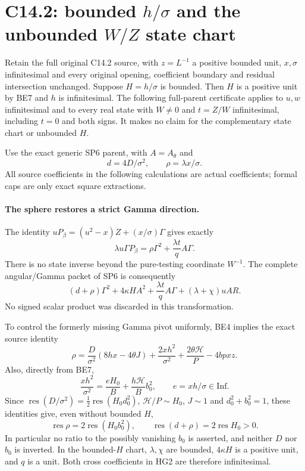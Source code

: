 \section{C14.2: bounded $h/\sigma$ and the unbounded $W/Z$ state chart}
\label{sec:r19-c142-bounded-H}

Retain the full original C14.2 source, with $z=L^{-1}$ a positive
bounded unit, $x,\sigma$ infinitesimal and every original opening,
coefficient boundary and residual intersection unchanged.  Suppose
$H=h/\sigma$ is bounded.  Then $H$ is a positive unit by BE7 and
$h$ is infinitesimal.  The following full-parent certificate applies
to $u,w$ infinitesimal and to every real state with $W\ne0$ and
$t=Z/W$ infinitesimal, including $t=0$ and both signs.  It makes
no claim for the complementary state chart or unbounded $H$.

Use the exact generic SP6 parent, with $A=A_\theta$ and
\[
 d=4D/\sigma^2,\qquad \rho=\lambda x/\sigma.
\]
All source coefficients in the following calculations are actual
coefficients; formal caps are only exact square extractions.

\paragraph{The sphere restores a strict Gamma direction.}
The identity $uP_\beta=(u^2-x)Z+(x/\sigma)\Gamma$ gives exactly
\[
 \lambda u\Gamma P_\beta
       =\rho\Gamma^2+\frac{\lambda t}{q}A\Gamma.
 \tag{HG1}
\]
There is no state inverse beyond the pure-testing coordinate $W^{-1}$.
The complete angular/Gamma packet of SP6 is consequently
\[
 (d+\rho)\Gamma^2+4\kappa H A^2
       +\frac{\lambda t}{q}A\Gamma
       +(\lambda+\chi)uAR.
 \tag{HG2}
\]
No signed scalar product was discarded in this transformation.

To control the formerly missing Gamma pivot uniformly, BE4 implies
the exact source identity
\[
 \rho=\frac D{\sigma^2}(8hx-4\theta J)
       +\frac{2xh^2}{\sigma^2}
       +\frac{2\theta\mathcal H}{P}-4bp xz.
 \tag{HG3}
\]
Also, directly from BE7,
\[
 \frac{xh^2}{\sigma^2}
    =\frac{eH_0}{B}+\frac{h\mathcal H}{B}b_0^2,
 \qquad e=xh/\sigma\in\mathrm{Inf}.
 \tag{HG4}
\]
Since $\operatorname{res}(D/\sigma^2)=
\tfrac12\operatorname{res}(H_0d_0^2)$,
$\mathcal H/P\sim H_0$, $J\sim1$ and
$d_0^2+b_0^2=1$, these identities give, even without bounded $H$,
\[
 \operatorname{res}\rho=2\operatorname{res}(H_0b_0^2),\qquad
 \operatorname{res}(d+\rho)=2\operatorname{res}H_0>0.
 \tag{HG5}
\]
In particular no ratio to the possibly vanishing $b_0$ is asserted,
and neither $D$ nor $b_0$ is inverted.  In the bounded-$H$ chart,
$\lambda,\chi$ are bounded,
$4\kappa H$ is a positive unit, and $q$ is a unit.  Both cross
coefficients in HG2 are therefore infinitesimal.

